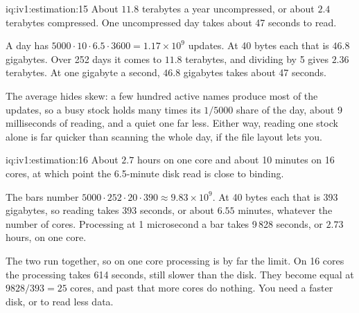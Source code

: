 \begin{solution}{iq:iv1:estimation:15}
About $11.8$ terabytes a year uncompressed, or about $2.4$ terabytes compressed. One uncompressed day takes about 47 seconds to read.

A day has $5000 \cdot 10 \cdot 6.5 \cdot 3600 = 1.17 \times 10^9$ updates. At 40 bytes each that is $46.8$ gigabytes. Over 252 days it comes to $11.8$ terabytes, and dividing by 5 gives $2.36$ terabytes. At one gigabyte a second, $46.8$ gigabytes takes about 47 seconds.

The average hides skew: a few hundred active names produce most of the updates, so a busy stock holds many times its $1/5000$ share of the day, about 9 milliseconds of reading, and a quiet one far less. Either way, reading one stock alone is far quicker than scanning the whole day, if the file layout lets you.

\end{solution}

\begin{solution}{iq:iv1:estimation:16}
About $2.7$ hours on one core and about 10 minutes on 16 cores, at which point the 6.5-minute disk read is close to binding.

The bars number $5000 \cdot 252 \cdot 20 \cdot 390 \approx 9.83 \times 10^9$. At 40 bytes each that is 393 gigabytes, so reading takes 393 seconds, or about $6.55$ minutes, whatever the number of cores. Processing at 1 microsecond a bar takes 9\,828 seconds, or $2.73$ hours, on one core.

The two run together, so on one core processing is by far the limit. On 16 cores the processing takes 614 seconds, still slower than the disk. They become equal at $9828/393 = 25$ cores, and past that more cores do nothing. You need a faster disk, or to read less data.

\end{solution}

